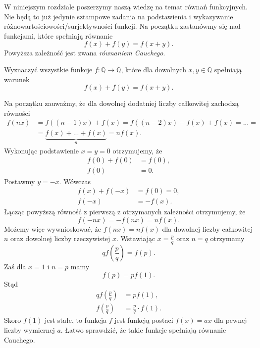 

\noindent
W niniejszym rozdziale poszerzymy naszą wiedzę na temat równań funkcyjnych. Nie będą to już jedynie sztampowe zadania na podstawienia i wykazywanie różnowartościowości/surjektywności funkcji. Na początku zastanówmy się nad funkcjami, które spełniają równanie
\[
	f(x) + f(y) = f(x + y).
\]
Powyższa zależność jest zwana \textit{równaniem Cauchego}.

\vspace{10px}


\noindent
Wyznaczyć wszystkie funkcje $f:\mathbb{Q}\longrightarrow\mathbb{Q}$, które dla dowolnych $x, y \in \mathbb{Q}$ spełniają warunek
\[
	f(x) + f(y) = f(x + y).
\]


\noindent
Na początku zauważmy, że dla dowolnej dodatniej liczby całkowitej zachodzą równości
\begin{align*}
	f(nx) &= f((n - 1)x) + f(x) = f((n - 2)x) + f(x) + f(x) = ... = \\
	&=  \underbrace{f(x) + ... + f(x)}_{n} = nf(x).
\end{align*}
Wykonując podstawienie $x = y = 0$ otrzymujemy, że
\begin{align*}
	f(0) + f(0) &= f(0), \\
	f(0) &= 0.
\end{align*}
Postawmy $y = -x$. Wówczas
\begin{align*}
	f(x) + f(-x) &= f(0) = 0, \\
	f(-x) &= -f(x).
\end{align*}
Łącząc powyższą równość z pierwszą z otrzymanych zależności otrzymujemy, że
\[
	f(-nx) = -f(nx) = nf(x).
\]
Możemy więc wywnioskować, że $f(nx) 
= nf(x)$ dla dowolnej liczby całkowitej $n$ oraz dowolnej liczby rzeczywistej $x$. Wstawiając $x = \frac{p}{q}$ oraz $n = q$ otrzymamy
\[
	qf\left(\frac{p}{q}\right) = f(p).
\]
Zaś dla $x = 1$ i $n = p$ mamy
\[
	f(p) = pf(1).
\]
Stąd
\begin{align*}
	qf\left(\frac{p}{q}\right) &= pf(1), \\
	f\left(\frac{p}{q}\right) &= \frac{p}{q} \cdot f(1).
\end{align*}
Skoro $f(1)$ jest stałe, to funkcja $f$ jest funkcją postaci $f(x) = ax$ dla pewnej liczby wymiernej $a$. Łatwo sprawdzić, że takie funkcje spełniają równanie Cauchego.

